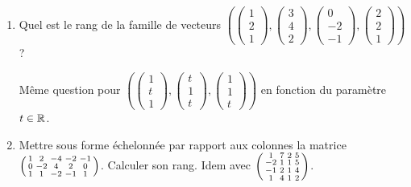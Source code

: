 \begin{frame}

\begin{miniexercice}
\begin{enumerate}
 
  \item Quel est le rang de la famille de vecteurs
  $\left( 
  \left(\begin{smallmatrix} 1\\2\\1 \end{smallmatrix}\right),
  \left(\begin{smallmatrix} 3\\4\\2 \end{smallmatrix}\right),
  \left(\begin{smallmatrix} 0\\-2\\-1 \end{smallmatrix}\right),
  \left(\begin{smallmatrix} 2\\2\\1 \end{smallmatrix}\right)
  \right)$ ?
  
  Même question pour
  $\left( 
  \left(\begin{smallmatrix} 1\\t\\1 \end{smallmatrix}\right),
  \left(\begin{smallmatrix} t\\1\\t \end{smallmatrix}\right),
  \left(\begin{smallmatrix} 1\\1\\t \end{smallmatrix}\right)
  \right)$ 
  en fonction du paramètre $t\in \mathbb{R}$.
  
  \item Mettre sous forme échelonnée par rapport aux colonnes la matrice 
  $\left(\begin{smallmatrix} 1 &2  &-4 &-2 &-1 \cr
                0 &-2 &4  &2  &0  \cr
                1 &1  &-2 &-1 &1  \cr \end{smallmatrix}\right)$. Calculer son rang.
                Idem avec             
                $\left(\begin{smallmatrix} 1  &7  &2  &5  \cr
                -2 &1  &1  &5  \cr
                -1 &2  &1  &4  \cr
                1  &4  &1  &2  \cr \end{smallmatrix}\right)$. 
                

\end{enumerate}
\end{miniexercice}
\end{frame}
